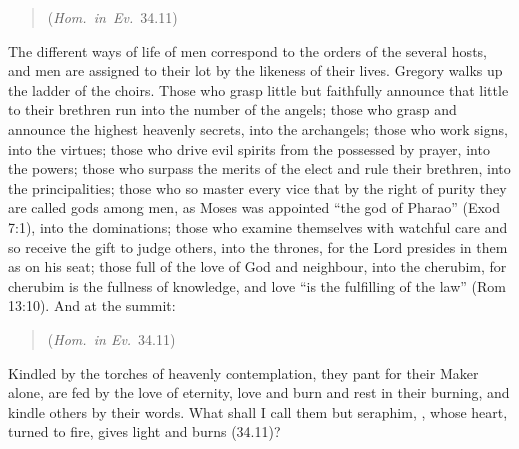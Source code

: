 \begin{quote}
 (\emph{Hom.~in~Ev.}~34.11)
\end{quote}

\noindent The different ways of life of men correspond to the orders of the
several hosts, and men are assigned to their lot by the likeness of their
lives. Gregory walks up the ladder of the choirs. Those who grasp little but
faithfully announce that little to their brethren run into the number of the
angels; those who grasp and announce the highest heavenly secrets, into the
archangels; those who work signs, into the virtues; those who drive evil
spirits from the possessed by prayer, into the powers; those who surpass the
merits of the elect and rule their brethren, into the principalities; those
who so master every vice that by the right of purity they are called gods
among men, as Moses was appointed ``the god of Pharao'' (Exod 7:1), into the
dominations; those who examine themselves with watchful care and so receive the
gift to judge others, into the thrones, for the Lord presides in them as on
his seat; those full of the love of God and neighbour, into the cherubim, for
cherubim is the fullness of knowledge, and love ``is the fulfilling of the
law'' (Rom 13:10). And at the summit:

\begin{quote}
 (\emph{Hom.\ in Ev.}\ 34.11)
\end{quote}

\noindent Kindled by the torches of heavenly contemplation, they pant for
their Maker alone, are fed by the love of eternity, love and burn and rest in
their burning, and kindle others by their words. What shall I call them but
seraphim, ,
whose heart, turned to fire, gives light and burns (34.11)?

